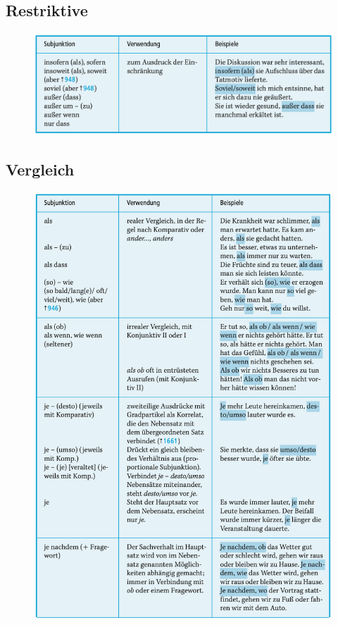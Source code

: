 \documentclass[UTF8]{report}
\begin{document}
\subsection{Restriktive}
\begin{figure}[H]
    \centering
    \includegraphics[scale=0.55]{res.png}
\end{figure}


\subsection{Vergleich}
\begin{figure}[H]
    \centering
    \includegraphics[scale=0.85]{verg.png}
\end{figure}
\end{document}
